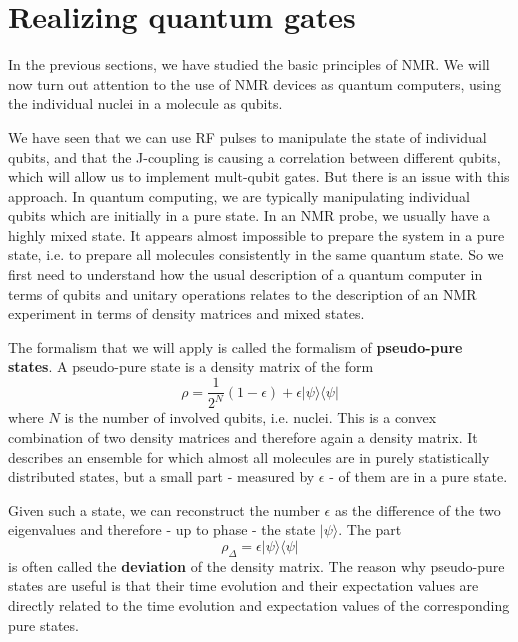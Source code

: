 \documentclass[a4paper, draft]{article}
\theoremstyle{own}
\theoremstyle{remark}
\begin{document}
\section{Realizing quantum gates}


In the previous sections, we have studied the basic principles of NMR. We will now turn out attention to the use of NMR devices as quantum computers, using the individual nuclei in a molecule as qubits. 

We have seen that we can use RF pulses to manipulate the state of individual qubits, and that the J-coupling is causing a correlation between different qubits, which will allow us to implement mult-qubit gates. But there is an issue with this approach. In quantum computing, we are typically manipulating individual qubits which are initially in a pure state. In an NMR probe, we usually have a highly mixed state. It appears almost impossible to prepare the system in a pure state, i.e. to prepare all molecules consistently in the same quantum state. So we first need to understand how the usual description of a quantum computer in terms of qubits and unitary operations relates to the description of an NMR experiment in terms of density matrices and mixed states.

The formalism that we will apply is called the formalism of {\bf pseudo-pure states}. A pseudo-pure state is a density matrix of the form
$$
\rho = \frac{1}{2^N} (1-\epsilon) + \epsilon |\psi \rangle \langle \psi | 
$$
where $N$ is the number of involved qubits, i.e. nuclei. This is a convex combination of two density matrices and therefore again a density matrix. It describes an ensemble for which almost all molecules are in purely statistically distributed states, but a small part - measured by $\epsilon$ - of them are in a pure state. 

Given such a state, we can reconstruct the number $\epsilon$ as the difference of the two eigenvalues and therefore - up to phase - the state $|\psi \rangle$. The part 
$$
\rho_{\Delta} = \epsilon |\psi \rangle \langle \psi | 
$$
is often called the {\bf deviation} of the density matrix. The reason why pseudo-pure states are useful is that their time evolution and their expectation values are directly related to the time evolution and expectation values of the corresponding pure states.
\end{document}
